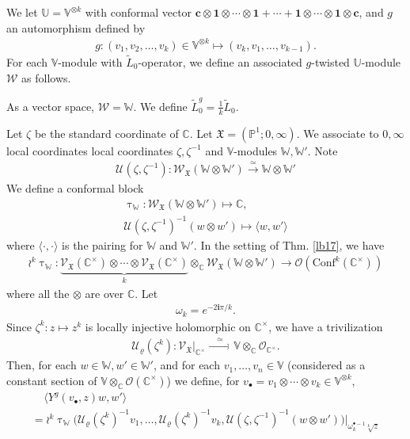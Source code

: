 \documentclass[12pt,a4paper,notitlepage]{article}
\theoremstyle{definition}
\theoremstyle{plain}
\newcommand{\fk}{\mathfrak}
\newcommand{\mc}{\mathcal}
\newcommand{\wtd}{\widetilde}
\newcommand{\id}{\mathbf{1}}
\newcommand{\Conf}{\mathrm{Conf}}
\newcommand{\bk}[1]{\langle {#1}\rangle}
\newcommand{\scr}{\mathscr}
\newcommand{\im}{\mathbf{i}}
\newcommand{\blt}{\bullet}
\newcommand{\Vbb}{\mathbb V}
\newcommand{\Ubb}{\mathbb U}
\newcommand{\Wbb}{\mathbb W}
\newcommand{\Cbb}{\mathbb C}
\newcommand{\Pbb}{\mathbb P}
\newcommand{\cbf}{\mathbf c}
\numberwithin{equation}{section}
\begin{document}
We let $\Ubb=\Vbb^{\otimes k}$ with conformal vector $\cbf\otimes\id\otimes\cdots\otimes\id+\cdots+\id\otimes\cdots\otimes\id\otimes\cbf$, and $g$ an automorphism defined by
\begin{align*}
g:(v_1,v_2,\dots,v_k)\in\Vbb^{\otimes k}\mapsto (v_k,v_1,\dots,v_{k-1}).	
\end{align*}
For each $\Vbb$-module with $\wtd L_0$-operator, we define an associated $g$-twisted $\Ubb$-module $\mc W$ as follows. 

As a vector space, $\mc W=\Wbb$. We define $\wtd L_0^g=\frac 1k\wtd L_0$.

Let $\zeta$ be the standard coordinate of $\Cbb$. Let $\fk X=(\Pbb^1;0,\infty)$. We associate to $0,\infty$ local coordinates local coordinates $\zeta,\zeta^{-1}$  and $\Vbb$-modules $\Wbb,\Wbb'$. Note
\begin{align*}
\mc U(\zeta,\zeta^{-1}):\scr W_{\fk X}(\Wbb\otimes\Wbb')\xrightarrow{\simeq}\Wbb\otimes\Wbb'	
\end{align*}
We define a conformal block
\begin{gather*}
\uptau_\Wbb:\scr W_{\fk X}(\Wbb\otimes\Wbb')\mapsto\Cbb,\\
\mc U(\zeta,\zeta^{-1})^{-1}(w\otimes w')\mapsto \bk{w,w'}
\end{gather*}
where $\bk{\cdot,\cdot}$ is the pairing for $\Wbb$ and $\Wbb'$. In the setting of Thm. \ref{lb17}, we have
\begin{gather*}
\wr^k\uptau_\Wbb:\underbrace{\scr V_{\fk X}(\Cbb^\times)\otimes\cdots \otimes\scr V_{\fk X}(\Cbb^\times)}_k\otimes_\Cbb\scr W_{\fk X}(\Wbb\otimes\Wbb')\rightarrow\scr O(\Conf^k(\Cbb^\times))
\end{gather*}
where all the $\otimes$ are over $\Cbb$. Let  \index{zz@$\omega_k=e^{-2\im\pi/k}$}
\begin{align*}
\omega_k=e^{-2\im\pi/k}.	
\end{align*}
Since $\zeta^k:z\mapsto z^k$ is locally injective holomorphic on $\Cbb^\times$, we have a trivilization
\begin{align*}
\mc U_\varrho(\zeta^k):	\scr V_{\fk X}|_{\Cbb^\times}\xrightarrow{\quad\simeq\quad}\Vbb\otimes_\Cbb\scr O_{\Cbb^\times}.
\end{align*}
Then, for each $w\in\Wbb,w'\in\Wbb'$, and for each $v_1,\dots,v_n\in\Vbb$ (considered as a constant section of $\Vbb\otimes_\Cbb\scr O(\Cbb^\times)$) we define, for $v_\blt=v_1\otimes\cdots\otimes v_k\in\Vbb^{\otimes k}$,
\begin{equation}
\boxed{
\begin{array}{l}
~~~~~\bk{Y^g(v_\blt,z)w,w'}\\[0.8ex]
=\wr^k\uptau_\Wbb\big(\mc U_\varrho(\zeta^k)^{-1}v_1,\dots,\mc U_\varrho(\zeta^k)^{-1}v_k,\mc U(\zeta,\zeta^{-1})^{-1}(w\otimes w')\big)\Big|_{\omega_k^{\blt-1}\sqrt[k]{z}}	
\end{array}		\label{eq42}
}
\end{equation}
\end{document}
